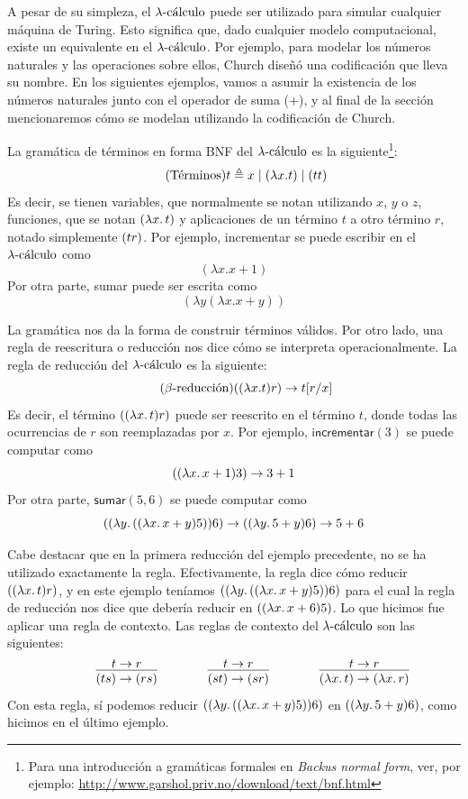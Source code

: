 A pesar de su simpleza, el \( \lambdacalculus \) puede ser utilizado para simular cualquier máquina de Turing. Esto significa que, dado cualquier modelo computacional, existe un equivalente en el \( \lambdacalculus \).
Por ejemplo, para modelar los números naturales y las operaciones sobre ellos, Church diseñó una codificación que lleva su nombre. En los siguientes ejemplos, vamos a asumir la existencia de los números naturales junto con el operador de suma (\( + \)), y al final de la sección mencionaremos cómo se modelan utilizando la codificación de Church.

La gramática de términos en forma BNF del \( \lambdacalculus \) es la siguiente\footnote{Para una introducción a gramáticas formales en \textit{Backus normal form}, ver, por ejemplo: \url{http://www.garshol.priv.no/download/text/bnf.html}}:
\[
  \tag{Términos}
  t \triangleq x \mid (\lambda x . t) \mid (\app{t}{t})
\]
Es decir, se tienen variables, que normalmente se notan utilizando \( x \), \( y \) o \( z \), funciones, que se notan \( \lcabstr{x}{t} \) y aplicaciones de un término \( t \) a otro término \( r \), notado simplemente \( \lcapp{t}{r} \).
Por ejemplo, \textsf{incrementar} se puede escribir en el \( \lambdacalculus \) como
\[ (\lambda x . x + 1) \]
Por otra parte, \textsf{sumar} puede ser escrita como
\[ (\lambda y (\lambda x . x + y)) \]

La gramática nos da la forma de construir términos válidos. Por otro lado, una regla de reescritura o reducción nos dice cómo se interpreta operacionalmente.
La regla de reducción del \( \lambdacalculus \) es la siguiente:
\[
  \tag{\(\beta\text{-reducción}\)}
  ((\lambda x . t) r) \reducesto t [r/x]
\]
Es decir, el término \( \lcapp{\lcabstr{x}{t}}{r} \) puede ser reescrito en el término \( t \), donde todas las ocurrencias de \( r \) son reemplazadas por \( x \).
Por ejemplo, \( \mathsf{incrementar}(3) \) se puede computar como
\[ \lcapp{\lcabstr{x}{x + 1}}{3} \reducesto 3 + 1 \]
Por otra parte, \( \mathsf{sumar}(5, 6) \) se puede computar como
\[ \lcapp{\lcabstr{y}{\lcapp{\lcabstr{x}{x + y}}{5}}}{6} \reducesto \lcapp{\lcabstr{y}{5 + y}}{6} \reducesto 5 + 6 \]

Cabe destacar que en la primera reducción del ejemplo precedente, no se ha utilizado exactamente la regla. Efectivamente, la regla dice cómo reducir \( \lcapp{\lcabstr{x}{t}}{r} \), y en este ejemplo teníamos \( \lcapp{\lcabstr{y}{\lcapp{\lcabstr{x}{x + y}}{5}}}{6} \) para el cual la regla de reducción nos dice que debería reducir en \( \lcapp{\lcabstr{x}{x + 6}}{5} \). Lo que hicimos fue aplicar una regla de contexto. Las reglas de contexto del \( \lambdacalculus \) son las siguientes:
\[
  \quad\quad\quad
  \infer{\lcapp{t}{s} \reducesto \lcapp{r}{s}}{t \reducesto r}
  \quad\quad\quad\quad
  \infer{\lcapp{s}{t} \reducesto \lcapp{s}{r}}{t \reducesto r}
  \quad\quad\quad\quad
  \infer{\lcabstr{x}{t} \reducesto \lcabstr{x}{r}}{t \reducesto r}
\]
Con esta regla, sí podemos reducir \( \lcapp{\lcabstr{y}{\lcapp{\lcabstr{x}{x + y}}{5}}}{6} \) en \( \lcapp{\lcabstr{y}{5 + y}}{6} \), como hicimos en el último ejemplo.

